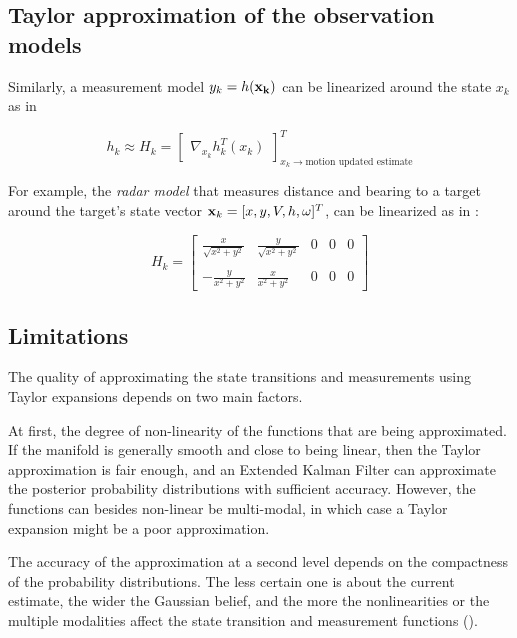 \subsection{Taylor approximation of the observation models}


Similarly, a measurement model ${{y}}_k=h(\mathbf{x_k})$ can be linearized around the state $x_{k}$ as in 


\begin{equation}
\label{eq:linearize_jacobian2}
h_{k} \approx H_{k} =
\begin{bmatrix}
\nabla_{x_{k}} h_{k}^{T}(x_{k})
\end{bmatrix}_{x_{k} \rightarrow\text{motion updated estimate}}^{T}
\end{equation}

For example, the \emph{radar model} that measures distance and bearing  to a target around the target's state vector $\mathbf{x}_k = [x,y,{V},h,{\omega}]^T$, can be linearized as in :


\begin{equation}
\label{eq:linearize_radar}
H_k =
\begin{bmatrix}
\frac{x}{\sqrt{x^2+y^2}} &\frac{y}{\sqrt{x^2+y^2}} &0 &0 &0 \\\\
-\frac{y}{x^2+y^2} &\frac{x}{x^2+y^2} &0 &0 &0
\end{bmatrix}
\end{equation}

\subsection{Limitations}

The quality of approximating the state transitions and measurements using Taylor expansions depends on two main factors. 


At first, the degree of non-linearity of the functions that are being approximated. If the manifold is generally smooth and close to being linear, then the Taylor approximation is fair enough, and an Extended Kalman Filter can approximate the posterior probability distributions with sufficient accuracy. However, the functions can besides non-linear be multi-modal, in which case a Taylor expansion might be a poor approximation. 


The accuracy of the approximation at a second level depends on the compactness of the probability distributions. The less certain one is about the current estimate, the wider the Gaussian belief, and the more the nonlinearities or the multiple modalities affect the state transition and measurement functions ().

